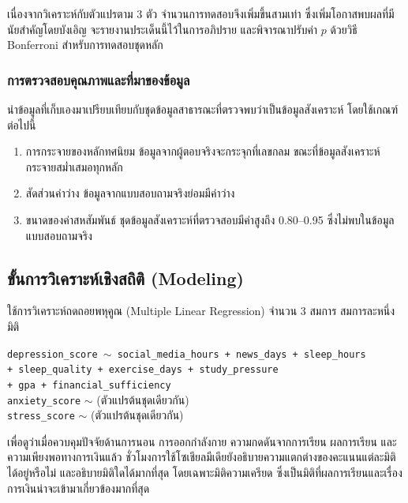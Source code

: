 \noindent
เนื่องจากวิเคราะห์กับตัวแปรตาม 3 ตัว จำนวนการทดสอบจึงเพิ่มขึ้นสามเท่า
ซึ่งเพิ่มโอกาสพบผลที่มีนัยสำคัญโดยบังเอิญ
จะรายงานประเด็นนี้ไว้ในการอภิปราย และพิจารณาปรับค่า $p$ ด้วยวิธี Bonferroni สำหรับการทดสอบชุดหลัก

\subsubsection*{การตรวจสอบคุณภาพและที่มาของข้อมูล}

นำข้อมูลที่เก็บเองมาเปรียบเทียบกับชุดข้อมูลสาธารณะที่ตรวจพบว่าเป็นข้อมูลสังเคราะห์
โดยใช้เกณฑ์ต่อไปนี้

\begin{enumerate}[label=\arabic*),leftmargin=1.9cm,itemsep=0.15em,topsep=0.2em]
    \item การกระจายของหลักทศนิยม ข้อมูลจากผู้ตอบจริงจะกระจุกที่เลขกลม ขณะที่ข้อมูลสังเคราะห์กระจายสม่ำเสมอทุกหลัก
    \item สัดส่วนค่าว่าง ข้อมูลจากแบบสอบถามจริงย่อมมีค่าว่าง
    \item ขนาดของค่าสหสัมพันธ์ ชุดข้อมูลสังเคราะห์ที่ตรวจสอบมีค่าสูงถึง 0.80--0.95 ซึ่งไม่พบในข้อมูลแบบสอบถามจริง
\end{enumerate}

\subsection{ขั้นการวิเคราะห์เชิงสถิติ (Modeling)}

ใช้การวิเคราะห์ถดถอยพหุคูณ (Multiple Linear Regression) จำนวน 3 สมการ สมการละหนึ่งมิติ

\begin{center}
\texttt{depression\_score $\sim$ social\_media\_hours + news\_days + sleep\_hours}\\
\texttt{+ sleep\_quality + exercise\_days + study\_pressure}\\
\texttt{+ gpa + financial\_sufficiency}\\[0.4em]
\texttt{anxiety\_score} $\sim$ (ตัวแปรต้นชุดเดียวกัน)\\[0.2em]
\texttt{stress\_score} $\sim$ (ตัวแปรต้นชุดเดียวกัน)
\end{center}

\noindent
เพื่อดูว่าเมื่อควบคุมปัจจัยด้านการนอน การออกกำลังกาย ความกดดันจากการเรียน ผลการเรียน
และความเพียงพอทางการเงินแล้ว
ชั่วโมงการใช้โซเชียลมีเดียยังอธิบายความแตกต่างของคะแนนแต่ละมิติได้อยู่หรือไม่ และอธิบายมิติใดได้มากที่สุด
โดยเฉพาะมิติความเครียด ซึ่งเป็นมิติที่ผลการเรียนและเรื่องการเงินน่าจะเข้ามาเกี่ยวข้องมากที่สุด

